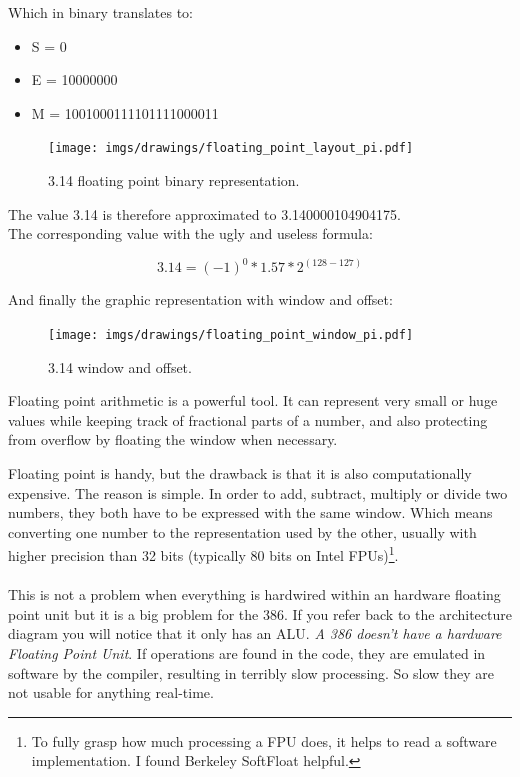 \documentclass[book.tex]{subfiles}
\begin{document}
Which in binary translates to:

\begin{itemize}
\item S = 0
\item E = 10000000
\item M = 1001000111101111000011
\end{itemize}

\begin{figure}[H]
\centering
\texttt{[image: imgs/drawings/floating\_point\_layout\_pi.pdf]}
\caption{3.14 floating point binary representation.}
\label{fig:fp_internals}
\end{figure}
  \bigskip

The value 3.14 is therefore approximated to 3.140000104904175.\\

The corresponding value with the ugly and useless formula:

\begin{equation}
3.14 = (-1)^0 * 1.57 * 2^{(128-127)}
\end{equation}

\bigskip

And finally the graphic representation with window and offset:\\

\begin{figure}[H]
\centering
\texttt{[image: imgs/drawings/floating\_point\_window\_pi.pdf]}

\caption{3.14 window and offset.}
\label{fig:fp_internals}
\end{figure}
  \bigskip

Floating point arithmetic is a powerful tool. It can represent very small or huge values while keeping track of fractional parts of a number, and also protecting from overflow by floating the window when necessary.\\
\par
Floating point is handy, but the drawback is that it is also computationally expensive. The reason is simple. In order to add, subtract, multiply or divide two numbers, they both have to be expressed with the same window. Which means converting one number to the representation used by the other, usually with higher precision than 32 bits (typically 80 bits on Intel FPUs)\footnote{To fully grasp how much processing a FPU does, it helps to read a software implementation. I found Berkeley SoftFloat helpful.}.\\
\\
This is not a problem when everything is hardwired within an hardware floating point unit but it is a big problem for the 386. If you refer back to the architecture diagram you will notice that it only has an ALU. \emph{A 386 doesn't have a hardware Floating Point Unit}. If  operations are found in the code, they are emulated in software by the compiler, resulting in terribly slow processing. So slow they are not usable for anything real-time.\\ 
\par
\end{document}

